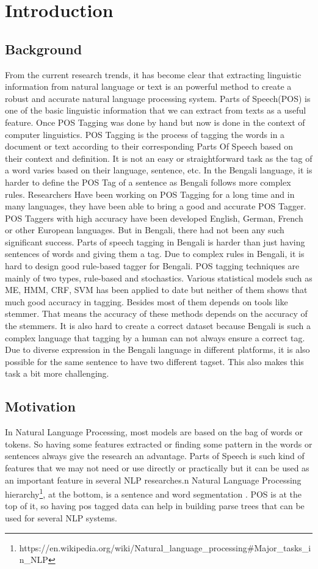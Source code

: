 \documentclass{standalone}
\begin{document}
\chapter{Introduction}
\label{chap:intro}
\section{Background}
 From the current research trends, it has become clear that extracting linguistic information from natural language or text is an powerful method to create a robust and accurate natural language processing system. Parts of Speech(POS) is one of the basic linguistic information that we can extract from texts as a useful feature. Once POS Tagging was done by hand but now is done in the context of computer linguistics. POS Tagging is the process of tagging the words in a document or text according to their corresponding Parts Of Speech based on their context and definition. It is not an easy or straightforward task as the tag of a word varies based on their language, sentence, etc. In the Bengali language, it is harder to define the POS Tag of a sentence as Bengali follows more complex rules. Researchers Have been working on POS Tagging for a long time and in many languages, they have been able to bring a good and accurate POS Tagger. POS Taggers with high accuracy have been developed  English, German, French or other European languages\cite{cite1}\cite{cite2}\cite{cite3}\cite{cite4}. But in Bengali, there had not been any such significant success.
Parts of speech tagging in Bengali is harder than just having sentences of words and giving them a tag. Due to complex rules in Bengali, it is hard to design good rule-based tagger for Bengali. POS tagging techniques are mainly of two types, rule-based and stochastics. Various statistical models such as ME, HMM, CRF, SVM  has been applied to date but neither of them shows that much good accuracy in tagging. Besides most of them depends on tools like stemmer. That means the accuracy of these methods depends on the accuracy of the stemmers. It is also hard to create a correct dataset because Bengali is such a complex language that tagging by a human can not always ensure a correct tag. Due to diverse expression in the Bengali language in different platforms, it is also possible for the same sentence to have two different tagset. This also makes this task a bit more challenging.
\section{Motivation}
In Natural Language Processing, most models are based on the bag of words or tokens. So having some features extracted or finding some pattern in the words or sentences always give the research an advantage. Parts of Speech is such kind of features that we may not need or use directly or practically but it can be used as an important feature in several NLP researches.n Natural Language Processing hierarchy\footnote{https://en.wikipedia.org/wiki/Natural_language_processing#Major_tasks_in_NLP}, at the bottom,  is a sentence and word segmentation . POS is at the top of it, so having pos tagged data can help in building parse trees  that can be used for several NLP systems.
\end{document}
